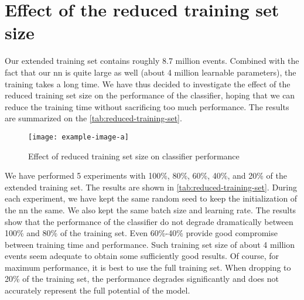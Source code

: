 \section{Effect of the reduced training set size}

Our extended training set contains roughly 8.7 million events. Combined with the fact that our \gls{nn} is quite large
as well (about 4 million learnable parameters), the training takes a long time. We have thus decided to investigate
the effect of the reduced training set size on the performance of the classifier, hoping that we can reduce the
training time without sacrificing too much performance. The results are summarized on the \autoref{tab:reduced-training-set}.


\begin{figure}[htb]
    \centering
    \texttt{[image: example-image-a]}
    \caption{Effect of reduced training set size on classifier performance}
    \label{tab:reduced-training-set}
\end{figure}

We have performed 5 experiments with 100\%, 80\%, 60\%, 40\%, and 20\% of the extended training set. The results are
shown in \autoref{tab:reduced-training-set}. During each experiment, we have kept the same random seed to keep the
initialization of the \gls{nn} the same. We also kept the same batch size and learning rate. The results show that the
performance of the classifier do not degrade dramatically between 100\% and 80\% of the training set. Even 60\%-40\%
provide good compromise between training time and performance. Such training set size of about 4 million events seem
adequate to obtain some sufficiently good results. Of course, for maximum performance, it is best to use the full
training set. When dropping to 20\% of the training set, the performance degrades significantly and does not accurately
represent the full potential of the model.
